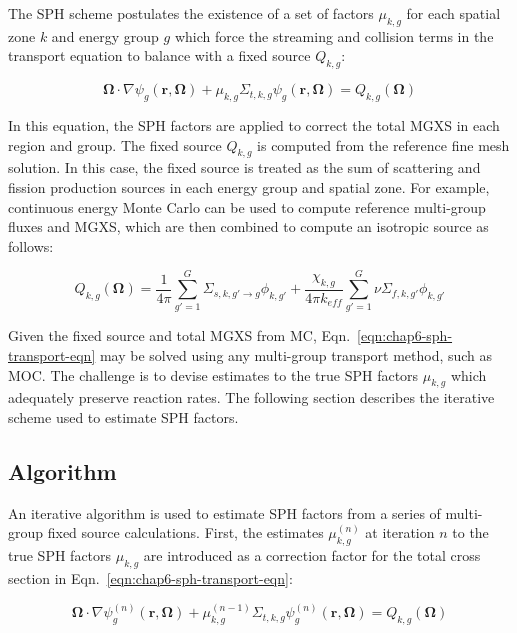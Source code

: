The \ac{SPH} scheme postulates the existence of a set of factors $\mu_{k,g}$ for each spatial zone $k$ and energy group $g$ which force the streaming and collision terms in the transport equation to balance with a fixed source $Q_{k,g}$:

\begin{dmath}
\label{eqn:chap6-sph-transport-eqn}
\mathbf{\Omega} \cdot \nabla \psi_{g}(\mathbf{r},\mathbf{\Omega}) + \mu_{k,g}\Sigma_{t,k,g}\psi_{g}(\mathbf{r},\mathbf{\Omega}) = Q_{k,g}(\mathbf{\Omega})
\end{dmath}

\noindent In this equation, the \ac{SPH} factors are applied to correct the total \ac{MGXS} in each region and group. The fixed source $Q_{k,g}$ is computed from the reference fine mesh solution. In this case,  the fixed source is treated as the sum of scattering and fission production sources in each energy group and spatial zone. For example, continuous energy Monte Carlo can be used to compute reference multi-group fluxes and \ac{MGXS}, which are then combined to compute an isotropic source as follows:

\begin{dmath}
\label{eqn:chap6-sph-source}
Q_{k,g}(\mathbf{\Omega}) = \frac{1}{4\pi} \sum_{g'=1}^{G} \Sigma_{s,k,g' \rightarrow g}\phi_{k,g'} + \frac{\chi_{k,g}}{4\pi k_{eff}}\sum_{g'=1}^{G} \nu\Sigma_{f,k,g'}\phi_{k,g'}
\end{dmath}

\noindent Given the fixed source and total \ac{MGXS} from \ac{MC}, Eqn.~\ref{eqn:chap6-sph-transport-eqn} may be solved using any multi-group transport method, such as \ac{MOC}. The challenge is to devise estimates to the true \ac{SPH} factors $\mu_{k,g}$ which adequately preserve reaction rates. The following section describes the iterative scheme used to estimate \ac{SPH} factors.

\subsection{Algorithm}
\label{subsec:chap6-sph-algorithm}

An iterative algorithm is used to estimate \ac{SPH} factors from a series of multi-group fixed source calculations. First, the estimates $\mu_{k,g}^{(n)}$ at iteration $n$ to the true \ac{SPH} factors $\mu_{k,g}$ are introduced as a correction factor for the total cross section in Eqn.~\ref{eqn:chap6-sph-transport-eqn}:

\begin{dmath}
\label{eqn:chap6-sph-transport-eqn-iterate}
\mathbf{\Omega} \cdot \nabla \psi_{g}^{(n)}(\mathbf{r},\mathbf{\Omega}) + \mu_{k,g}^{(n-1)}\Sigma_{t,k,g}\psi_{g}^{(n)}(\mathbf{r},\mathbf{\Omega}) = Q_{k,g}(\mathbf{\Omega})
\end{dmath}

